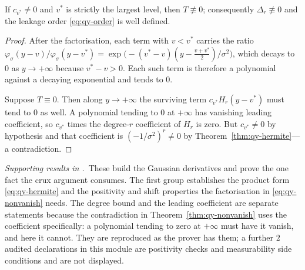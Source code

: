 \begin{theorem}
\label{thm:qy-nonvanish}
If $c_{v^{*}}\neq0$ and $v^{*}$ is strictly the largest level, then $T\not\equiv0$;
consequently $\Delta_{r}\not\equiv0$ and the leakage order \eqref{eq:qy-order} is well defined.
\end{theorem}

\begin{proof}
After the factorisation, each term with $v<v^{*}$ carries the ratio
$\varphi_{\sigma}(y-v)/\varphi_{\sigma}(y-v^{*})
=\exp\bigl(-(v^{*}-v)(y-\tfrac{v+v^{*}}{2})/\sigma^{2}\bigr)$, which decays to $0$ as
$y\to+\infty$ because $v^{*}-v>0$. Each such term is therefore a polynomial against a
decaying exponential and tends to $0$.

Suppose $T\equiv0$. Then along $y\to+\infty$ the surviving term $c_{v^{*}}H_{r}(y-v^{*})$
must tend to $0$ as well. A polynomial tending to $0$ at $+\infty$ has vanishing leading
coefficient, so $c_{v^{*}}$ times the degree-$r$ coefficient of $H_{r}$ is zero. But
$c_{v^{*}}\neq0$ by hypothesis and that coefficient is $(-1/\sigma^{2})^{r}\neq0$ by
Theorem~\ref{thm:qy-hermite}---a contradiction.
\end{proof}


\noindent\emph{Supporting results in .}~These build the Gaussian derivatives and prove the one fact the crux argument consumes. The first group establishes the product form \eqref{eq:qy-hermite} and the positivity and shift properties the factorisation in \eqref{eq:qy-nonvanish} needs. The degree bound and the leading coefficient are separate statements because the contradiction in Theorem~\ref{thm:qy-nonvanish} uses the coefficient specifically: a polynomial tending to zero at $+\infty$ must have it vanish, and here it cannot. They are reproduced as the prover has them; a further $2$ audited declarations in this module are positivity checks and measurability side conditions and are not displayed.

